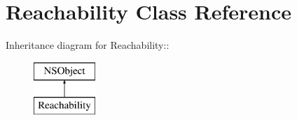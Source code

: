 \hypertarget{interface_reachability}{
\section{Reachability Class Reference}
\label{interface_reachability}
}
Inheritance diagram for Reachability::\begin{figure}[H]
\begin{center}
\leavevmode
\includegraphics[height=2cm]{interface_reachability}
\end{center}
\end{figure}
